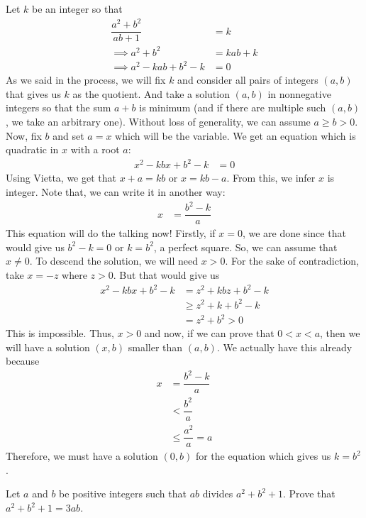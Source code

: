 \begin{solution}
	Let $k$ be an integer so that
		\begin{align*}
			\dfrac{a^2+b^2}{ab+1}
				& = k \\
		 \implies a^2+b^2
			 	& = kab+k\\
			\implies  a^2-kab+b^2-k
				& = 0
		\end{align*}
	As we said in the process, we will fix $k$ and consider all pairs of integers $(a,b)$ that gives us $k$ as the quotient. And take a solution $(a,b)$ in nonnegative integers so that the sum $a+b$ is minimum (and if there are multiple such $(a,b)$, we take an arbitrary one). Without loss of generality, we can assume $a\geq b>0$. Now, fix $b$ and set $a=x$ which will be the variable. We get an equation which is quadratic in $x$ with a root $a$:
		\begin{align*}
			x^2-kbx+b^2-k & = 0
		\end{align*}
	Using Vietta, we get that $x+a=kb$ or $x=kb-a$. From this, we infer $x$ is integer. Note that, we can write it in another way:
		\begin{align*}
			x & = \dfrac{b^2-k}{a}
		\end{align*}
	This equation will do the talking now! Firstly, if $x=0$, we are done since that would give us $b^2-k=0$ or $k=b^2$, a perfect square. So, we can assume that $x\neq0$. To descend the solution, we will need $x>0$. For the sake of contradiction, take $x=-z$ where $z>0$. But that would give us
		\begin{align*}
			x^2-kbx+b^2-k & = z^2+kbz+b^2-k\\
				  & \geq z^2+k+b^2-k\\
				  & = z^2+b^2> 0
		\end{align*}
	This is impossible. Thus, $x>0$ and now, if we can prove that $0<x<a$, then we will have a solution $(x,b)$ smaller than $(a,b)$. We actually have this already because
		\begin{align*}
			x & = \dfrac{b^2-k}{a}\\
	  & < \dfrac{b^2}{a}\\
	  &\leq\dfrac{a^2}{a} = a
		\end{align*}
	Therefore, we must have a solution $(0,b)$ for the equation which gives us $k=b^2$.
\end{solution}

\begin{problem}
	Let $a$ and $b$ be positive integers such that $ab$ divides $a^2 + b^2 + 1$. Prove that $a^2 + b^2 + 1=3ab$.
\end{problem}


